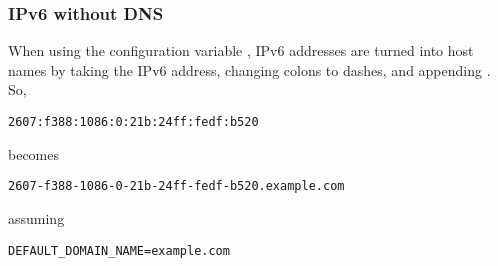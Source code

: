 \subsubsection{IPv6 without DNS}

When using the configuration variable ,
IPv6 addresses are turned into host names by taking the IPv6 address,
changing colons to dashes, and appending .
So,
\begin{verbatim}
2607:f388:1086:0:21b:24ff:fedf:b520
\end{verbatim}
becomes
\begin{verbatim}
2607-f388-1086-0-21b-24ff-fedf-b520.example.com
\end{verbatim}
assuming
\begin{verbatim}
DEFAULT_DOMAIN_NAME=example.com
\end{verbatim}

